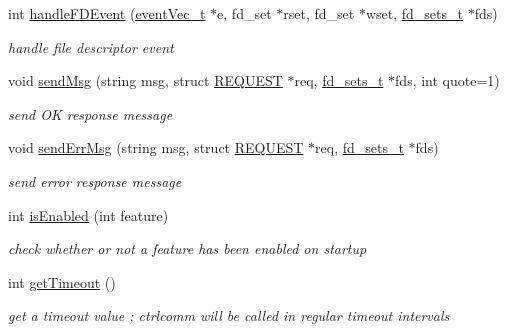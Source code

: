 \begin{DoxyCompactItemize}
\mbox{\label{classCtrlComm_ad61f03c20dd876772b6127a5436c2192}} 
int \hyperlink{classCtrlComm_ad61f03c20dd876772b6127a5436c2192}{handle\+F\+D\+Event} (\hyperlink{QualityManagerComponent_8h_acd67c59a21d5c694ab882c8905db0a2a}{event\+Vec\+\_\+t} $\ast$e, fd\+\_\+set $\ast$rset, fd\+\_\+set $\ast$wset, \hyperlink{structfd__sets__t}{fd\+\_\+sets\+\_\+t} $\ast$fds)
\begin{DoxyCompactList}\small\item\em handle file descriptor event \end{DoxyCompactList}\item 
\mbox{\label{classCtrlComm_a350e593176feaefebad0ea1e68bb4e51}} 
void \hyperlink{classCtrlComm_a350e593176feaefebad0ea1e68bb4e51}{send\+Msg} (string msg, struct \hyperlink{structREQUEST}{R\+E\+Q\+U\+E\+ST} $\ast$req, \hyperlink{structfd__sets__t}{fd\+\_\+sets\+\_\+t} $\ast$fds, int quote=1)
\begin{DoxyCompactList}\small\item\em send OK response message \end{DoxyCompactList}\item 
\mbox{\label{classCtrlComm_a7ac459479c0772e6536da73551f3ba12}} 
void \hyperlink{classCtrlComm_a7ac459479c0772e6536da73551f3ba12}{send\+Err\+Msg} (string msg, struct \hyperlink{structREQUEST}{R\+E\+Q\+U\+E\+ST} $\ast$req, \hyperlink{structfd__sets__t}{fd\+\_\+sets\+\_\+t} $\ast$fds)
\begin{DoxyCompactList}\small\item\em send error response message \end{DoxyCompactList}\item 
\mbox{\label{classCtrlComm_a6be57d266873bcd69afa3a98535b0b71}} 
int \hyperlink{classCtrlComm_a6be57d266873bcd69afa3a98535b0b71}{is\+Enabled} (int feature)
\begin{DoxyCompactList}\small\item\em check whether or not a feature has been enabled on startup \end{DoxyCompactList}\item 
\mbox{\label{classCtrlComm_ac7498c7579af7206df8a79d8b5d2f572}} 
int \hyperlink{classCtrlComm_ac7498c7579af7206df8a79d8b5d2f572}{get\+Timeout} ()
\begin{DoxyCompactList}\small\item\em get a timeout value ; ctrlcomm will be called in regular timeout intervals \end{DoxyCompactList}\item 

\end{DoxyCompactItemize}

